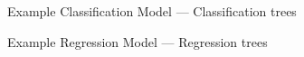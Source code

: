 \begin{frame}{Example Classification Model — Classification trees}
\end{frame}

\begin{frame}{Example Regression Model — Regression trees}
\end{frame}
